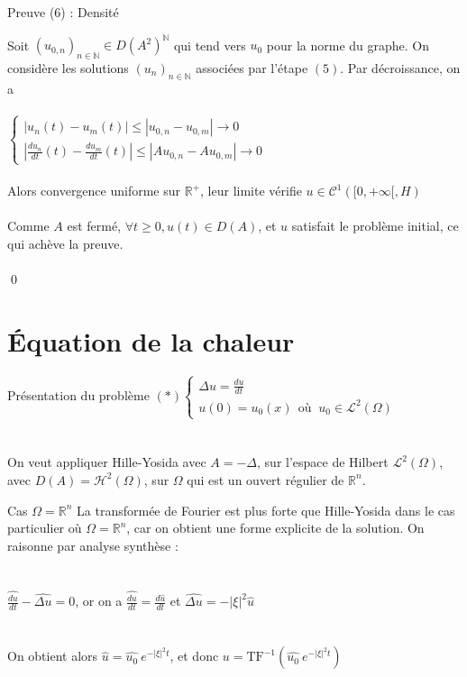 \documentclass[10pt]{beamer}
\begin{document}
\begin{frame}{Preuve (6) : Densité}

Soit $(u_{0,n})_{n\in \mathbb{N}} \in D(A^2)^\mathbb{N}$ qui tend vers $u_0$ pour la norme du graphe. On considère les solutions $(u_{n})_{n\in \mathbb{N}}$ associées par l'étape $(5)$. Par décroissance, on a \\~\\
$\begin{cases} |u_{n}(t) - u_{m}(t)| \leq |u_{0,n}-u_{0,m}| \to 0 \\ \displaystyle |\frac{du_{n}}{dt}(t) - \frac{du_{m}}{dt}(t)|\leq |Au_{0,n}-Au_{0,m}| \to 0 \end{cases}$ \\ ~ \\ 

Alors convergence uniforme sur $\mathbb{R}^+$, leur limite vérifie $u\in \mathcal{C}^1([0,+\infty[,H)$ \\~\\
Comme $A$ est fermé, $\forall t \geq 0, u(t) \in D(A)$, et $u$ satisfait le problème initial, ce qui achève la preuve. \\~\\ \qed
\end{frame}
\section{Équation de la chaleur}

\begin{frame}{Présentation du problème}
$(*)\begin{cases} \displaystyle \Delta u = \frac{du}{dt} \\ u(0)=u_0(x) \ \ \text{où } \ u_0 \in \mathcal{L}^2(\Omega) \end{cases}$ \\ ~ \\ ~ \\ 

On veut appliquer Hille-Yosida avec $A=-\Delta$, sur l'espace de Hilbert $\mathcal{L}^2(\Omega)$, avec $D(A)= \mathcal{H}^2(\Omega)$, sur $\Omega$ qui est un ouvert régulier de $\mathbb{R}^n$.
\end{frame}



\begin{frame}{Cas $\Omega=\mathbb{R}^n$}
La transformée de Fourier est plus forte que Hille-Yosida dans le cas particulier où $\Omega=\mathbb{R}^n$, car on obtient une forme explicite de la solution. On raisonne par analyse synthèse : \\ ~ \\ ~ \\  
$\displaystyle \widehat{\frac{du}{dt}}-\widehat{\Delta u}=0$, or on a $\widehat{\frac{du}{dt}}=\frac{d\hat{u}}{dt}$ et $\widehat{\Delta u}=-|\xi|^2\hat{u}$ \\ ~ \\ ~ \\ 

On obtient alors $\widehat{u}=\widehat{u_0} \ e^{-|\xi|^2t}$, et donc $u=\text{TF}^{-1}(\widehat{u_0} \ e^{-|\xi|^2t})$
\end{frame}
\end{document}
